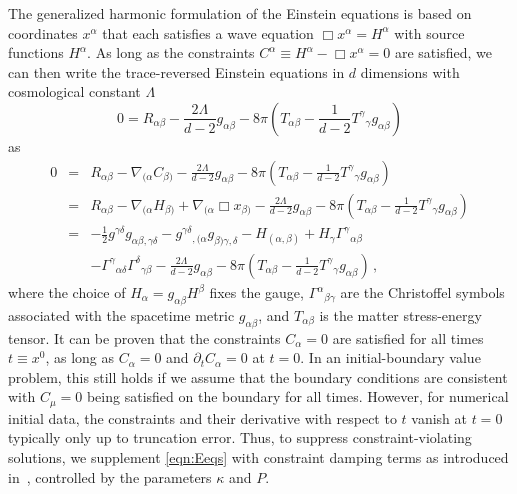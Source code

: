 \documentclass[a4paper,11pt]{article}
\numberwithin{equation}{section}
\begin{document}
The generalized harmonic formulation of the Einstein equations is based on coordinates $x^\alpha$ that each satisfies a wave equation $\Box x^{\alpha}=H^\alpha$ with source functions $H^\alpha$.
As long as the constraints $C^\alpha \equiv H^\alpha-\Box x^\alpha=0$ are satisfied,
we can then write the trace-reversed Einstein equations in $d$ dimensions with cosmological constant $\Lambda$
\begin{equation}
0=R_{\alpha\beta} - \frac{2\Lambda}{d-2} g_{\alpha\beta} - 8\pi\left( T_{\alpha\beta} - \frac{1}{d-2} {T^\gamma}_\gamma g_{\alpha\beta} \right)
\end{equation}
as
\begin{eqnarray}
0
&=& R_{\alpha\beta} - \nabla_{(\alpha} C_{\beta)} - \frac{2\Lambda}{d-2} g_{\alpha\beta} - 8\pi\left( T_{\alpha\beta} - \frac{1}{d-2} {T^\gamma}_\gamma g_{\alpha\beta} \right) \nonumber \\
&=& R_{\alpha\beta} - \nabla_{(\alpha} H_{\beta)} + \nabla_{(\alpha} \Box{x}_{\beta)} - \frac{2\Lambda}{d-2} g_{\alpha\beta} - 8\pi\left( T_{\alpha\beta} - \frac{1}{d-2} {T^\gamma}_\gamma g_{\alpha\beta} \right) \nonumber \\
&=& -\frac{1}{2} g^{\gamma\delta} g_{\alpha\beta,\gamma\delta} - g^{\gamma\delta}{}_{,(\alpha}g_{\beta)\gamma,\delta} - H_{(\alpha,\beta)} + H_\gamma \Gamma^\gamma{}_{\alpha\beta} \nonumber \\
&&- \Gamma^\gamma{}_{\alpha\delta}\Gamma^\delta{}_{\gamma\beta} - \frac{2\Lambda}{d-2} g_{\alpha\beta} - 8\pi\left( T_{\alpha\beta} - \frac{1}{d-2} {T^\gamma}_\gamma g_{\alpha\beta}\right) \,, \label{eqn:Eeqs} 
\end{eqnarray}
where the choice of $H_\alpha = g_{\alpha\beta} H^\beta$ fixes the gauge, $\Gamma^\alpha{}_{\beta\gamma}$ are the Christoffel symbols associated with
the spacetime metric $g_{\alpha\beta}$, and $T_{\alpha\beta}$ is the matter stress-energy tensor. 
It can be proven that the constraints $C_\alpha=0$ are satisfied for all times $t\equiv x^0$, as long as $C_\alpha=0$ and $\partial_{t}C_\alpha=0$ at $t=0$. In an initial-boundary value problem, this still holds if we assume that the boundary conditions are consistent with $C_\mu=0$ being satisfied on the boundary for all times.
However, for numerical initial data, the constraints and their derivative with respect to $t$ vanish at $t=0$ typically only up to truncation error. Thus, to suppress constraint-violating solutions, we supplement \eqref{eqn:Eeqs} with constraint damping terms as introduced in~\cite{Gundlach:2005eh}, controlled by the parameters $\kappa$ and $P$.
\end{document}
